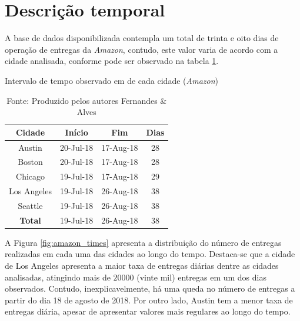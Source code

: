 \section{Descrição temporal}

A base de dados disponibilizada contempla um total de trinta e oito dias de operação de entregas da \textit{Amazon}, contudo, este valor varia de acordo com a cidade analisada, conforme pode ser observado na tabela \ref{tab:timesAmazon}.
%
\begin{table}[H]
    \centering
    \caption{Intervalo de tempo observado em de cada cidade (\textit{Amazon})} \label{tab:timesAmazon}
    \begin{tabular}{|cccc|}
        \hline
        \textbf{Cidade} & \textbf{Início} & \textbf{Fim} & \textbf{Dias} \\ \hline
        Austin          & 20-Jul-18       & 17-Aug-18    & 28            \\
        Boston          & 20-Jul-18       & 17-Aug-18    & 28            \\
        Chicago         & 19-Jul-18       & 17-Aug-18    & 29            \\
        Los Angeles     & 19-Jul-18       & 26-Aug-18    & 38            \\
        Seattle         & 19-Jul-18       & 26-Aug-18    & 38            \\ \hline
        \textbf{Total}  & 19-Jul-18       & 26-Aug-18    & 38            \\ \hline
    \end{tabular}
    \caption*{Fonte: Produzido pelos autores Fernandes \& Alves}
\end{table}
%
A Figura \ref{fig:amazon_times} apresenta a distribuição do número de entregas realizadas em cada uma das cidades ao longo do tempo.
Destaca-se que a cidade de Los Angeles apresenta a maior taxa de entregas diárias dentre as cidades analisadas, atingindo mais de $20000$ (vinte mil) entregas em um dos dias observados. 
Contudo, inexplicavelmente, há uma queda no número de entregas a partir do dia 18 de agosto de 2018.
Por outro lado, Austin tem a menor taxa de entregas diária, apesar de apresentar valores mais regulares ao longo do tempo.
%
